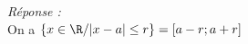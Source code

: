 \textit{Réponse : }\\

On a $\left\lbrace x \in \R / \vert x - a \vert \leq r \right \rbrace  = [a - r; a + r]$